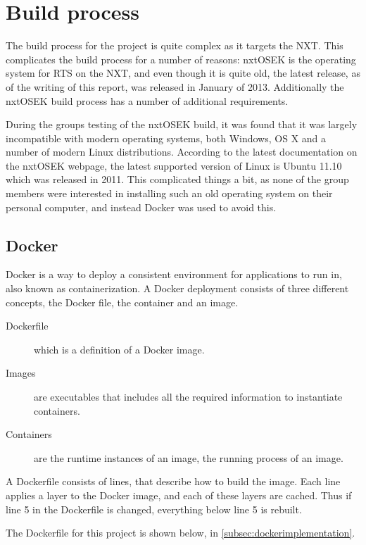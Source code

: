 \section{Build process}\label{sec:buildprocess}
The build process for the project is quite complex as it targets the NXT.
This complicates the build process for a number of reasons:
nxtOSEK is the operating system for RTS on the NXT, and even though it is quite old, the latest release, as of the writing of this report, was released in January of 2013\cite{osekrelease}.
Additionally the nxtOSEK build process has a number of additional requirements.

During the groups testing of the nxtOSEK build, it was found that it was largely incompatible with modern operating systems, both Windows, OS X and a number of modern Linux distributions.
According to the latest documentation on the nxtOSEK webpage, the latest supported version of Linux is Ubuntu 11.10 which was released in 2011.
This complicated things a bit, as none of the group members were interested in installing such an old operating system on their personal computer, and instead Docker was used to avoid this.

\subsection{Docker}\label{subsec:docker}
Docker is a way to deploy a consistent environment for applications to run in, also known as containerization\cite{dockerdocstart}.
A Docker deployment consists of three different concepts, the Docker file, the container and an image.
\begin{description}
    \item [Dockerfile] which is a definition of a Docker image.
    \item [Images] are executables that includes all the required information to instantiate containers.
    \item[Containers] are the runtime instances of an image, the running process of an image.
\end{description}

A Dockerfile consists of lines, that describe how to build the image.
Each line applies a layer to the Docker image, and each of these layers are cached.
Thus if line 5 in the Dockerfile is changed, everything below line 5 is rebuilt.

The Dockerfile for this project is shown below, in \autoref{subsec:dockerimplementation}.

